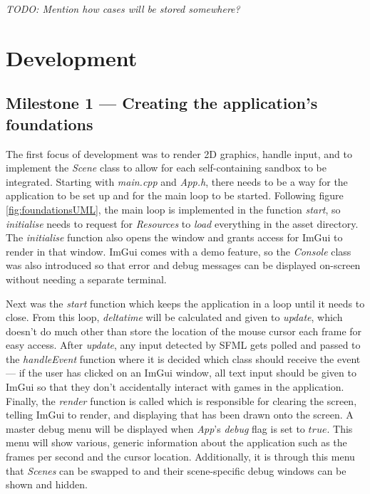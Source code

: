 \documentclass[11pt, a4paper]{report}
\begin{document}
\emph{TODO: Mention how cases will be stored somewhere?}

\section{Development}
\label{sec:development}

\subsection[Creating the application's foundations]{Milestone 1 --- Creating the application's foundations}
\label{subsec:creatingTheFoundations}

The first focus of development was to render 2D graphics, handle input, and to implement the \emph{Scene} class to allow for each self-containing sandbox to be integrated. Starting with \emph{main.cpp} and \emph{App.h}, there needs to be a way for the application to be set up and for the main loop to be started. Following figure \ref{fig:foundationsUML}, the main loop is implemented in the function \emph{start}, so \emph{initialise} needs to request for \emph{Resources} to \emph{load} everything in the asset directory. The \emph{initialise} function also opens the window and grants access for ImGui to render in that window. ImGui comes with a demo feature, so the \emph{Console} class was also introduced so that error and debug messages can be displayed on-screen without needing a separate terminal.

Next was the \emph{start} function which keeps the application in a loop until it needs to close. From this loop, \emph{deltatime} will be calculated and given to \emph{update}, which doesn't do much other than store the location of the mouse cursor each frame for easy access. After \emph{update}, any input detected by SFML gets polled and passed to the \emph{handleEvent} function where it is decided which class should receive the event --- if the user has clicked on an ImGui window, all text input should be given to ImGui so that they don't accidentally interact with games in the application. Finally, the \emph{render} function is called which is responsible for clearing the screen, telling ImGui to render, and displaying that has been drawn onto the screen. A master debug menu will be displayed when \emph{App}'s \emph{debug} flag is set to $true$. This menu will show various, generic information about the application such as the frames per second and the cursor location. Additionally, it is through this menu that \emph{Scenes} can be swapped to and their scene-specific debug windows can be shown and hidden.
\end{document}
